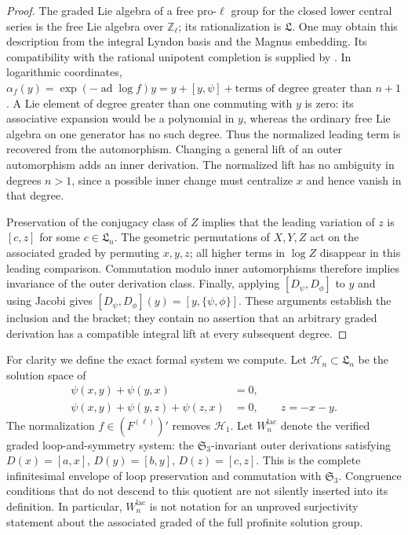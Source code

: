 \begin{proof}
The graded Lie algebra of a free pro-$\ell$ group for the closed lower
central series is the free Lie algebra over $\mathbb Z_\ell$; its
rationalization is $\mathfrak L$.  One may obtain this description
from the integral Lyndon basis and the Magnus embedding.  Its
compatibility with the rational unipotent completion is supplied by
\citet[Theorem~A.6 and Corollary~A.10]{HM2003}.
In logarithmic coordinates,
$\alpha_f(y)=\exp(-\operatorname{ad}\log f)y
=y+[y,\psi]+\text{terms of degree greater than }n+1$.
A Lie element of degree greater than one commuting with $y$ is zero:
its associative expansion would be a polynomial in $y$, whereas the
ordinary free Lie algebra on one generator has no such degree.
Thus the normalized leading term is recovered from the automorphism.
Changing a general lift of an outer automorphism adds an inner
derivation.  The normalized lift has no ambiguity in degrees $n>1$,
since a possible inner change must centralize $x$ and hence vanish in
that degree.

Preservation of the conjugacy class of $Z$ implies that the leading
variation of $z$ is $[c,z]$ for some $c\in\mathfrak L_n$.
The geometric permutations of $X,Y,Z$ act on the associated graded by
permuting $x,y,z$; all higher terms in $\log Z$ disappear in this
leading comparison.  Commutation modulo inner automorphisms therefore
implies invariance of the outer derivation class.  Finally, applying
$[D_\psi,D_\phi]$ to $y$ and using Jacobi gives
$[D_\psi,D_\phi](y)=[y,\{\psi,\phi\}]$.
These arguments establish the inclusion and the bracket; they contain
no assertion that an arbitrary graded derivation has a compatible
integral lift at every subsequent degree.
\end{proof}

For clarity we define the exact formal system we compute.  Let
$\mathcal H_n\subset\mathfrak L_n$ be the solution space of
\begin{align}
 \psi(x,y)+\psi(y,x)&=0,\label{eq:graded-two}\\
 \psi(x,y)+\psi(y,z)+\psi(z,x)&=0,\qquad z=-x-y.
 \label{eq:graded-three}
\end{align}
The normalization $f\in(F^{(\ell)})'$ removes $\mathcal H_1$.
Let $W^{\mathrm{lac}}_n$ denote the verified graded loop-and-symmetry
system: the $\mathfrak S_3$-invariant outer derivations satisfying
$D(x)=[a,x]$, $D(y)=[b,y]$, $D(z)=[c,z]$.
This is the complete infinitesimal envelope of loop preservation and
commutation with $\mathfrak S_3$.  Congruence conditions that do not
descend to this quotient are not silently inserted into its definition.
In particular, $W^{\mathrm{lac}}_n$ is not notation for an unproved
surjectivity statement about the associated graded of the full
profinite solution group.

